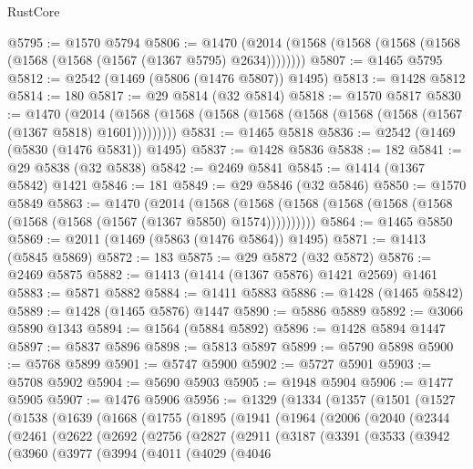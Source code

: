 \begin{lexlean}{RustCore}
\begin{coremodule}
@5795 := @1570 @5794
@5806 := @1470 (@2014 (@1568 (@1568 (@1568 (@1568 (@1568 (@1568 (@1567 (@1367 @5795) @2634))))))))
@5807 := @1465 @5795
@5812 := @2542 (@1469 (@5806 (@1476 @5807)) @1495)
@5813 := @1428 @5812
@5814 := 180
@5817 := @29 @5814 (@32 @5814)
@5818 := @1570 @5817
@5830 := @1470
    (@2014 (@1568 (@1568 (@1568 (@1568 (@1568 (@1568 (@1568 (@1567 (@1367 @5818) @1601)))))))))
@5831 := @1465 @5818
@5836 := @2542 (@1469 (@5830 (@1476 @5831)) @1495)
@5837 := @1428 @5836
@5838 := 182
@5841 := @29 @5838 (@32 @5838)
@5842 := @2469 @5841
@5845 := @1414 (@1367 @5842) @1421
@5846 := 181
@5849 := @29 @5846 (@32 @5846)
@5850 := @1570 @5849
@5863 := @1470
    (@2014
      (@1568 (@1568 (@1568 (@1568 (@1568 (@1568 (@1568 (@1568 (@1567 (@1367 @5850) @1574))))))))))
@5864 := @1465 @5850
@5869 := @2011 (@1469 (@5863 (@1476 @5864)) @1495)
@5871 := @1413 (@5845 @5869)
@5872 := 183
@5875 := @29 @5872 (@32 @5872)
@5876 := @2469 @5875
@5882 := @1413 (@1414 (@1367 @5876) @1421 @2569) @1461
@5883 := @5871 @5882
@5884 := @1411 @5883
@5886 := @1428 (@1465 @5842)
@5889 := @1428 (@1465 @5876) @1447
@5890 := @5886 @5889
@5892 := @3066 @5890 @1343
@5894 := @1564 (@5884 @5892)
@5896 := @1428 @5894 @1447
@5897 := @5837 @5896
@5898 := @5813 @5897
@5899 := @5790 @5898
@5900 := @5768 @5899
@5901 := @5747 @5900
@5902 := @5727 @5901
@5903 := @5708 @5902
@5904 := @5690 @5903
@5905 := @1948 @5904
@5906 := @1477 @5905
@5907 := @1476 @5906
@5956 := @1329
    (@1334
      (@1357
        (@1501
          (@1527
            (@1538
              (@1639
                (@1668
                  (@1755
                    (@1895
                      (@1941
                        (@1964
                          (@2006
                            (@2040
                              (@2344
                                (@2461
                                  (@2622
                                    (@2692
                                      (@2756
                                        (@2827
                                          (@2911
                                            (@3187
                                              (@3391
                                                (@3533
                                                  (@3942
                                                    (@3960
                                                      (@3977
                                                        (@3994
                                                          (@4011
                                                            (@4029
                                                              (@4046

\end{coremodule}
\end{lexlean}
